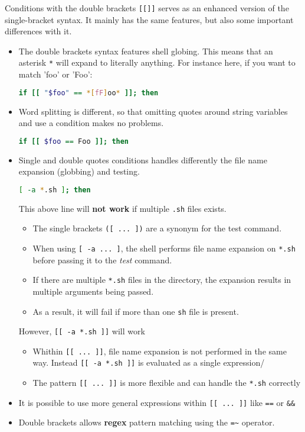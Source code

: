 \documentclass{article}
\newcommand{\inlinecode}[1]{\colorbox{backcolour}{\footnotesize{\texttt{#1}}}}
\begin{document}
Conditions with the double brackets \inlinecode{[[]]} serves as an enhanced version of the single-bracket syntax. It mainly has the same features, but also some important differences with it.
\begin{itemize}
	\item The double brackets syntax features shell globing. This means that an asterisk \inlinecode{*} will expand to literally anything. For instance here, if you want to match 'foo' or 'Foo':
	      \begin{lstlisting}[style=command, language=bash]
if [[ "$foo" == *[fF]oo* ]]; then
\end{lstlisting}
	\item Word splitting is different, so that omitting quotes around string variables and use a condition makes no problems.
	      \begin{lstlisting}[style=command, language=bash]
if [[ $foo == Foo ]]; then
\end{lstlisting}
	\item Single and double quotes conditions handles differently the file name expansion (globbing) and testing.
	      \begin{lstlisting}[style=command, language=bash]
[ -a *.sh ]; then
\end{lstlisting}
	      This above line will \textbf{not work} if multiple \inlinecode{.sh} files exists.
	      \begin{itemize}
		      \item The single brackets \inlinecode{([ ... ])} are a synonym for the test command.
		      \item When using \inlinecode{[ -a ... ]}, the shell performs file name expansion on \inlinecode{*.sh} before passing it to the \textit{test} command.
		      \item If there are multiple \inlinecode{*.sh} files in the directory, the expansion results in multiple arguments being passed.
		      \item As a result, it will fail if more than one \inlinecode{sh} file is present.
	      \end{itemize}
	      However, \inlinecode{[[ -a *.sh ]]} will work
	      \begin{itemize}
		      \item Whithin \inlinecode{[[ ... ]]}, file name expansion is not performed in the same way. Instead \inlinecode{[[ -a *.sh ]]} is evaluated as a single expression/ \item The pattern \inlinecode{[[ ... ]]} is more flexible and can handle the \inlinecode{*.sh} correctly
	      \end{itemize}
	\item It is possible to use more general expressions within \inlinecode{[[ ... ]]} like \inlinecode{==} or \inlinecode{\&\&}
	\item Double brackets allows \textbf{regex} pattern matching using the \inlinecode{=\~} operator.
\end{itemize}
\end{document}
